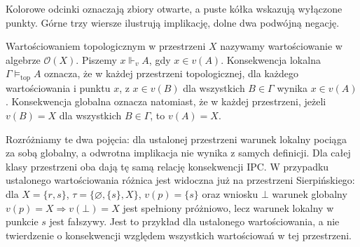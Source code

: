 \begin{center}
\end{center}
Kolorowe odcinki oznaczają zbiory otwarte, a puste
kółka wskazują wyłączone punkty. Górne trzy wiersze
ilustrują implikację, dolne dwa podwójną negację.

\begin{definicja}
\label{def:ncl-heyting-topological-semantics}
Wartościowaniem topologicznym w przestrzeni $X$
nazywamy wartościowanie w algebrze $\mathcal O(X)$.
Piszemy $x\Vdash_v A$, gdy $x\in v(A)$.
Konsekwencja lokalna $\Gamma\models_{\mathrm{top}}A$
oznacza, że w każdej przestrzeni topologicznej,
dla każdego wartościowania i punktu $x$, z
$x\in v(B)$ dla wszystkich $B\in\Gamma$
wynika $x\in v(A)$.
Konsekwencja globalna oznacza natomiast, że
w każdej przestrzeni, jeżeli $v(B)=X$ dla wszystkich
$B\in\Gamma$, to $v(A)=X$.
\end{definicja}
Rozróżniamy te dwa pojęcia: dla ustalonej przestrzeni
warunek lokalny pociąga za sobą globalny, a odwrotna
implikacja nie wynika z samych definicji.
Dla całej klasy przestrzeni oba dają tę samą
relację konsekwencji IPC. W przypadku ustalonego
wartościowania różnica jest widoczna już na
przestrzeni Sierpińskiego: dla $X=\{r,s\}$,
$\tau=\{\varnothing,\{s\},X\}$, $v(p)=\{s\}$
oraz wniosku $\bot$ warunek globalny
$v(p)=X\Rightarrow v(\bot)=X$ jest spełniony
próżniowo, lecz warunek lokalny w punkcie $s$
jest fałszywy. Jest to przykład dla ustalonego
wartościowania, a nie twierdzenie o konsekwencji
względem wszystkich wartościowań w tej przestrzeni.

